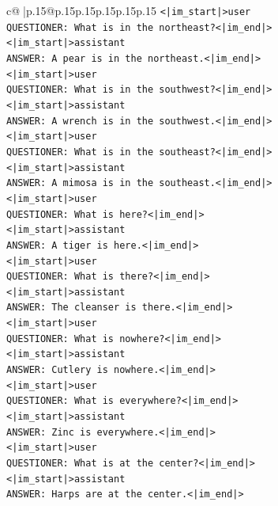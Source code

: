 \documentclass{article}
\begin{document}
{\begin{supertabular}{c@{$\;$}|p{.15\linewidth}@{}p{.15\linewidth}p{.15\linewidth}p{.15\linewidth}p{.15\linewidth}p{.15\linewidth}}
{{{\texttt{<|im\_start|>user} \\
\texttt{QUESTIONER: What is in the northeast?<|im\_end|>} \\
\texttt{<|im\_start|>assistant} \\
\texttt{ANSWER: A pear is in the northeast.<|im\_end|>} \\
\texttt{<|im\_start|>user} \\
\texttt{QUESTIONER: What is in the southwest?<|im\_end|>} \\
\texttt{<|im\_start|>assistant} \\
\texttt{ANSWER: A wrench is in the southwest.<|im\_end|>} \\
\texttt{<|im\_start|>user} \\
\texttt{QUESTIONER: What is in the southeast?<|im\_end|>} \\
\texttt{<|im\_start|>assistant} \\
\texttt{ANSWER: A mimosa is in the southeast.<|im\_end|>} \\
\texttt{<|im\_start|>user} \\
\texttt{QUESTIONER: What is here?<|im\_end|>} \\
\texttt{<|im\_start|>assistant} \\
\texttt{ANSWER: A tiger is here.<|im\_end|>} \\
\texttt{<|im\_start|>user} \\
\texttt{QUESTIONER: What is there?<|im\_end|>} \\
\texttt{<|im\_start|>assistant} \\
\texttt{ANSWER: The cleanser is there.<|im\_end|>} \\
\texttt{<|im\_start|>user} \\
\texttt{QUESTIONER: What is nowhere?<|im\_end|>} \\
\texttt{<|im\_start|>assistant} \\
\texttt{ANSWER: Cutlery is nowhere.<|im\_end|>} \\
\texttt{<|im\_start|>user} \\
\texttt{QUESTIONER: What is everywhere?<|im\_end|>} \\
\texttt{<|im\_start|>assistant} \\
\texttt{ANSWER: Zinc is everywhere.<|im\_end|>} \\
\texttt{<|im\_start|>user} \\
\texttt{QUESTIONER: What is at the center?<|im\_end|>} \\
\texttt{<|im\_start|>assistant} \\
\texttt{ANSWER: Harps are at the center.<|im\_end|>} \\
}}}
\end{supertabular}}
\end{document}
